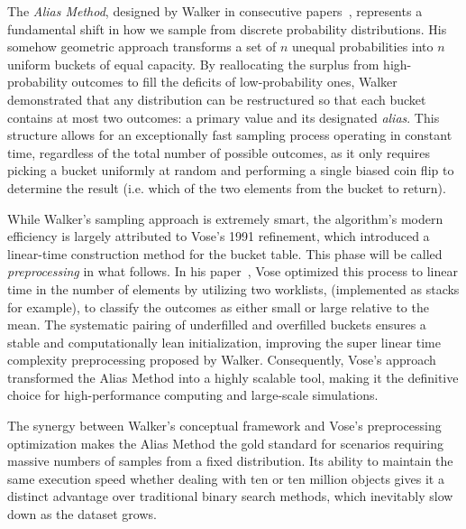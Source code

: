 The \emph{Alias Method}, designed by Walker in consecutive papers~\cite{Walker74,Walker77}, represents a fundamental shift
in how we sample from discrete probability distributions.
His somehow geometric approach transforms 
a set of $n$ unequal probabilities into $n$ uniform buckets of equal capacity. 
By reallocating the surplus from high-probability outcomes to fill the deficits of low-probability ones,
Walker demonstrated that any distribution can be restructured so that each bucket contains at most two outcomes: 
a primary value and its designated \emph{alias}. This structure allows for an exceptionally fast sampling process
operating in constant time, regardless of the total number of possible outcomes, as it only requires 
picking a bucket uniformly at random and performing a single biased coin flip to determine the result
(i.e. which of the two elements from the bucket to return).

While Walker’s sampling approach is extremely smart, the algorithm’s modern efficiency is largely attributed
to Vose’s 1991 refinement, which introduced a linear-time construction method for the bucket table.
This phase will be called \emph{preprocessing} in what follows. In his paper~\cite{Vose91},
Vose optimized this process to linear time in the number of elements by utilizing two worklists,
(implemented as stacks for example), to classify the outcomes as either small or large relative to the mean. 
The systematic pairing of underfilled and overfilled buckets
ensures a stable and computationally lean initialization, improving the super linear time
complexity preprocessing proposed by Walker.
Consequently, Vose’s approach transformed the Alias Method into a highly scalable tool, 
making it the definitive choice for high-performance computing and large-scale simulations.

The synergy between Walker’s conceptual framework and Vose’s preprocessing optimization makes 
the Alias Method the gold standard for scenarios requiring massive numbers of samples from a fixed distribution. 
Its ability to maintain the same execution speed whether dealing with ten or ten million objects gives 
it a distinct advantage over traditional binary search methods, which inevitably slow down as the dataset grows.

